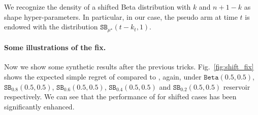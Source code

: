 We recognize the density of a shifted Beta distribution with $k$ and $n+1-k$ as shape hyper-parameters. In particular, in our case, the pseudo arm at time $t$ is endowed with the distribution $\texttt{SB}_{\mu^\star}(t-k_t,1)$.

\paragraph{Some illustrations of the fix.}

Now we show some synthetic results after the previous tricks. Fig.~\ref{fig:shift_fix} shows the expected simple regret of \DTTTS compared to \ISHA, again, under $\texttt{Beta}(0.5,0.5)$, $\texttt{SB}_{0.8}(0.5,0.5)$, $\texttt{SB}_{0.6}(0.5,0.5)$, $\texttt{SB}_{0.4}(0.5,0.5)$ and $\texttt{SB}_{0.2}(0.5,0.5)$ reservoir respectively. We can see that the performance of \DTTTS for shifted cases has been significantly enhanced.

